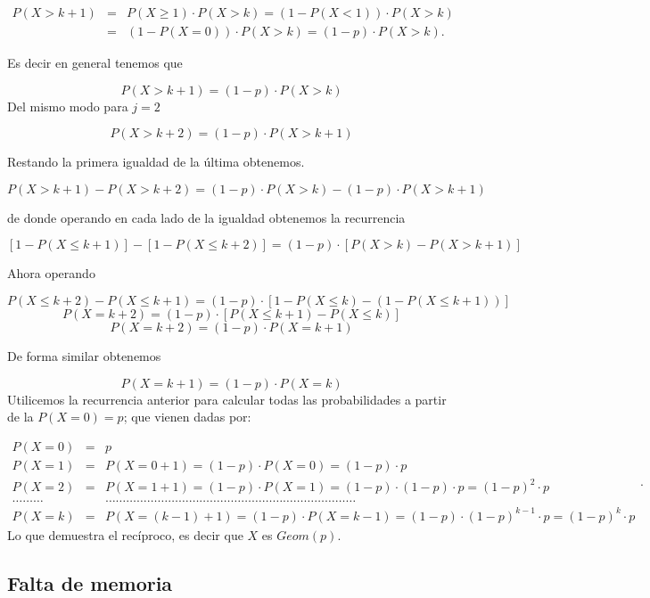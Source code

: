 \documentclass[]{book}
\begin{document}
\[
\begin{eqnarray*}
P(X>k+1)&=&P(X\geq 1)\cdot P(X>k)=\left(1-P(X<1)\right)\cdot P(X>k)\\
&=&\left(1-P(X=0)\right)\cdot P(X>k)=(1-p)\cdot P(X>k).
\end{eqnarray*}
\]

Es decir en general tenemos que

\[
P(X>k+1)=(1-p)\cdot P(X>k)
\]
Del mismo modo para \(j=2\)

\[
P(X>k+2)=(1-p)\cdot P(X>k+1)
\]

Restando la primera igualdad de la última obtenemos.

\[
P(X>k+1)-P(X>k+2)=(1-p)\cdot P(X>k)-(1-p)\cdot P(X>k+1)
\]

de donde operando en cada lado de la igualdad obtenemos la recurrencia

\[
[1-P(X\leq k+1)]-[1-P(X\leq k+2)]=(1-p)\cdot [P(X>k)-P(X>k+1)]
\]

Ahora operando

\[
P(X\leq k+2)-P(X\leq k+1)=(1-p)\cdot[1-P(X\leq k)-\left(1-P(X\leq k+1)\right)]
\]
\[
P(X=k+2)=(1-p)\cdot[P(X\leq k+1)-P(X\leq k)]
\]
\[
P(X=k+2)=(1-p)\cdot P(X=k+1)
\]

De forma similar obtenemos

\[
P(X=k+1)=(1-p)\cdot P(X=k)
\]
Utilicemos la recurrencia anterior para calcular todas las probabilidades a partir de la \(P(X=0)=p\); que vienen dadas por:

\[
\begin{eqnarray*}
P(X=0)&=& p\\
P(X=1)&=&P(X=0+1)= (1-p)\cdot P(X=0) =(1-p)\cdot  p\\
P(X=2)&=&P(X=1+1)= (1-p)\cdot P(X=1)=(1-p)\cdot (1-p)\cdot p=(1-p)^2\cdot p\\
\ldots \ldots\ldots && \ldots  \ldots \ldots \ldots\ldots\ldots\ldots\ldots\ldots\ldots\ldots\ldots\ldots\ldots\ldots\ldots\ldots\ldots\ldots\ldots\ldots\ldots\ldots\ldots\\
P(X=k)&=&P(X=(k-1)+1)= (1-p)\cdot P(X=k-1)=(1-p)\cdot (1-p)^{k-1}\cdot p=(1-p)^{k}\cdot p
\end{eqnarray*}.
\]
Lo que demuestra el recíproco, es decir que \(X\) es \(Geom(p)\).

\hypertarget{falta-de-memoria}{%
\subsection{Falta de memoria}\label{falta-de-memoria}}
\end{document}
